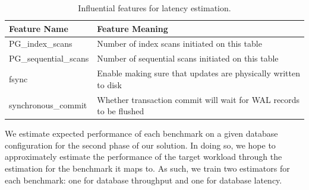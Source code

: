 \begin{table}[h!]
  \centering
  \begin{adjustbox}{max width=0.85\textwidth}
    \begin{tabular}{ll}
      \toprule
      Feature Name          & Feature Meaning                                                    \\
      \midrule
      PG\_index\_scans      & Number of index scans initiated on this table                      \\
      PG\_sequential\_scans & Number of sequential scans initiated on this table                 \\
      fsync                 & Enable making sure that updates are physically written to disk     \\
      synchronous\_commit   & Whether transaction commit will wait for WAL records to be flushed \\
      \bottomrule
    \end{tabular}
  \end{adjustbox}

  \caption{Influential features for latency estimation.}
  \label{tab:influential_features_for_latency}
\end{table}

We estimate expected performance of each benchmark on a given database
configuration for the second phase of our solution. In doing so, we
hope to approximately estimate the performance of the target workload
through the estimation for the benchmark it maps to. As such, we train
two estimators for each benchmark: one for database throughput and one
for database latency.

